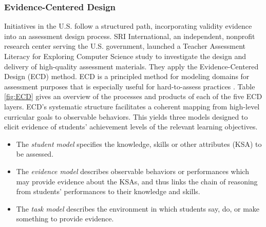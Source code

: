 

%



\subsubsection{Evidence-Centered Design}\label{sec:ECD}
Initiatives in the U.S. follow a structured path, incorporating validity evidence into an assessment design process. SRI International, an independent, nonprofit research center serving the U.S. government, launched a Teacher Assessment Literacy for Exploring Computer Science study to investigate the design and delivery of high-quality assessment materials. They apply the Evidence-Centered Design (ECD) method. ECD is a principled method for modeling domains for assessment purposes that is especially useful for hard-to-assess practices \cite{grover2016assessing}. Table \ref{fig:ECD} gives an overview of the processes and products of each of the five ECD layers. ECD's systematic structure facilitates a coherent mapping from high-level curricular goals to observable behaviors. This yields three models designed to elicit evidence of students' achievement levels of the relevant learning objectives.
\begin{itemize}
\item The \emph{student model} specifies the knowledge, skills or other attributes (KSA) to be assessed.
\item The \emph{evidence model} describes observable behaviors or performances which may provide evidence about the KSAs, and thus links the chain of reasoning from students’ performances to their knowledge and skills.
\item The \emph{task model} describes the environment in which students say, do, or make something to provide evidence.
\end{itemize}

